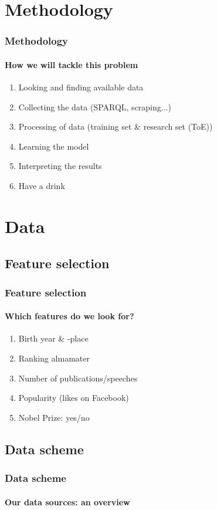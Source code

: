 \documentclass[nonav,sleutel,handout]{beamer}
\begin{document}
\section{Methodology}
\begin{frame}
\frametitle{Methodology}
\framesubtitle{How we will tackle this problem}
\begin{enumerate}
\item<1-> Looking and finding available data
\item<2-> Collecting the data (SPARQL, scraping...)
\item<3-> Processing of data (training set \& research set (ToE))
\item<4-> Learning the model
\item<5-> Interpreting the results
\item<6-> Have a drink
\end{enumerate}
\end{frame}

\section{Data}
\subsection{Feature selection}
\begin{frame}
\frametitle{Feature selection}
\framesubtitle{Which features do we look for?}

\begin{enumerate}
\item<1-> Birth year \& -place
\item<2-> Ranking almamater
\item<3-> Number of publications/speeches
\item<4-> Popularity (likes on Facebook)
\item<5-> Nobel Prize: yes/no
\end{enumerate}

\end{frame}

\subsection{Data scheme}
\begin{frame}
\frametitle{Data scheme}
\framesubtitle{Our data sources: an overview}

\end{frame}
\end{document}
